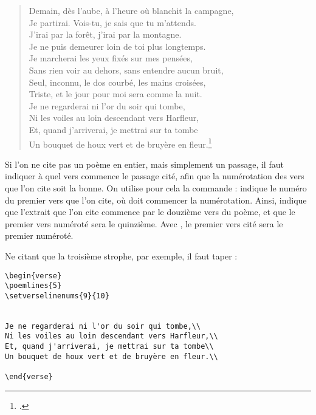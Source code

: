 \begin{verse}

Demain, dès l'aube, à l'heure où blanchit la campagne,\\
Je partirai. Vois-tu, je sais que tu m'attends.\\
J'irai par la forêt, j'irai par la montagne.\\
Je ne puis demeurer loin de toi plus longtemps.\\

Je marcherai les yeux fixés sur mes pensées,\\
Sans rien voir au dehors, sans entendre aucun bruit,\\
Seul, inconnu, le dos courbé, les mains croisées,\\
Triste, et le jour pour moi sera comme la nuit.\\

Je ne regarderai ni l'or du soir qui tombe,\\
Ni les voiles au loin descendant vers Harfleur,\\
Et, quand j'arriverai, je mettrai sur ta tombe\\
Un bouquet de houx vert et de bruyère en fleur.\footcite{demain}\\

\end{verse}



Si l'on ne cite pas un poème en entier, mais simplement un passage, il faut indiquer à quel vers commence le passage cité, afin que la numérotation des vers que l'on cite soit la bonne. On utilise pour cela la commande  :  indique le numéro du premier vers que l'on cite,  où doit commencer la numérotation. Ainsi,  indique que l'extrait que l'on cite commence par le douzième vers du poème, et que le premier vers numéroté sera le quinzième. Avec , le premier vers cité sera le premier numéroté.

Ne citant que la troisième strophe, par exemple, il faut taper :
\begin{verbatim}
\begin{verse}
\poemlines{5}
\setverselinenums{9}{10}


Je ne regarderai ni l'or du soir qui tombe,\\
Ni les voiles au loin descendant vers Harfleur,\\
Et, quand j'arriverai, je mettrai sur ta tombe\\
Un bouquet de houx vert et de bruyère en fleur.\\

\end{verse}
\end{verbatim}

